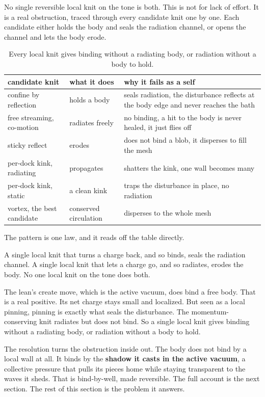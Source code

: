 No single reversible local knit on the tone is both. This is not for lack of effort. It is a real obstruction, traced through every candidate knit one by one. Each candidate either holds the body and seals the radiation channel, or opens the channel and lets the body erode.

\begin{table}[ht]
\centering
\begin{tabular}{@{}lll@{}}
\toprule
candidate knit & what it does & why it fails as a self \\
\midrule
confine by reflection & holds a body & seals radiation, the disturbance reflects at the body edge and never reaches the bath \\
free streaming, co-motion & radiates freely & no binding, a hit to the body is never healed, it just flies off \\
sticky reflect & erodes & does not bind a blob, it disperses to fill the mesh \\
per-dock kink, radiating & propagates & shatters the kink, one wall becomes many \\
per-dock kink, static & a clean kink & traps the disturbance in place, no radiation \\
vortex, the best candidate & conserved circulation & disperses to the whole mesh \\
\bottomrule
\end{tabular}
\caption{Every local knit gives binding without a radiating body, or radiation without a body to hold.}
\label{tab:obstruction}
\end{table}

The pattern is one law, and it reads off the table directly.

\begin{principle}
A single local knit that turns a charge back, and so binds, seals the radiation channel. A single local knit that lets a charge go, and so radiates, erodes the body. No one local knit on the tone does both.
\end{principle}

The lean's create move, which is the active vacuum, does bind a free body. That is a real positive. Its net charge stays small and localized. But seen as a local pinning, pinning is exactly what seals the disturbance. The momentum-conserving knit radiates but does not bind. So a single local knit gives binding without a radiating body, or radiation without a body to hold.

The resolution turns the obstruction inside out. The body does not bind by a local wall at all. It binds by the \textbf{shadow it casts in the active vacuum}, a collective pressure that pulls its pieces home while staying transparent to the waves it sheds. That is bind-by-well, made reversible. The full account is the next section. The rest of this section is the problem it answers.

